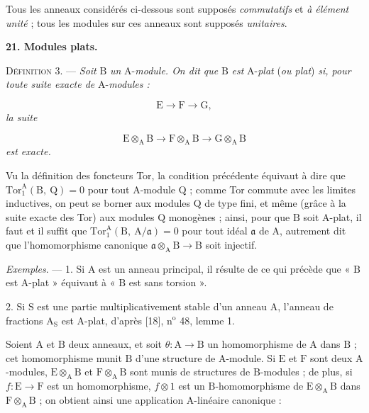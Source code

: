 Tous les anneaux considérés ci-dessous sont supposés \textit{commutatifs} et \textit{à élément unité} ; tous les modules sur ces anneaux sont supposés \textit{unitaires}.


\textbf{21. Modules plats.}

\textsc{Définition} 3. --- \textit{Soit} $\mathrm{B}$ \textit{un} $\mathrm{A}$-\textit{module. On dit que} $\mathrm{B}$ \textit{est} $\mathrm{A}$-\textit{plat} (\textit{ou plat}) \textit{si, pour toute suite exacte de} $\mathrm{A}$-\textit{modules :}

\begin{equation*}
\mathrm{E} \to \mathrm{F} \to \mathrm{G},
\end{equation*}
\textit{la suite}

\begin{equation*}
\mathrm{E} \otimes_{\mathrm{A}} \mathrm{B} \to \mathrm{F} \otimes_{\mathrm{A}} \mathrm{B} \to \mathrm{G} \otimes_{\mathrm{A}} \mathrm{B}
\end{equation*}
\textit{est exacte.}



Vu la définition des foncteurs Tor, la condition précédente équivaut à dire que $\mathrm{Tor}_1^{\mathrm{A}}(\mathrm{B},\ \mathrm{Q}) = 0$ pour tout $\mathrm{A}$-module $\mathrm{Q}$ ; comme Tor commute avec les limites inductives, on peut se borner aux modules $\mathrm{Q}$ de type fini, et même (grâce à la suite exacte des Tor) aux modules $\mathrm{Q}$ monogènes ; ainsi, pour que $\mathrm{B}$ soit $\mathrm{A}$-plat, il faut et il suffit que $\mathrm{Tor}_1^{\mathrm{A}}(\mathrm{B},\ \mathrm{A}/\mathfrak{a}) = 0$ pour tout idéal $\mathfrak{a}$ de $\mathrm{A}$, autrement dit que l'homomorphisme canonique $\mathfrak{a} \otimes_\mathrm{A} \mathrm{B} \to \mathrm{B}$ soit injectif.

\textit{Exemples}. --- 1. Si $\mathrm{A}$ est un anneau principal, il résulte de ce qui précède que « $\mathrm{B}$ est $\mathrm{A}$-plat » équivaut à « $\mathrm{B}$ est sans torsion ».

2. Si $\mathrm{S}$ est une partie multiplicativement stable d'un anneau $\mathrm{A}$, l'anneau de fractions $\mathrm{A}_{\mathrm{S}}$ est $\mathrm{A}$-plat, d'après [18], n$^{\mathrm{o}}$ 48, lemme 1.

Soient $\mathrm{A}$ et $\mathrm{B}$ deux anneaux, et soit $\theta : \mathrm{A} \to \mathrm{B}$ un homomorphisme de $\mathrm{A}$ dans $\mathrm{B}$ ; cet homomorphisme munit $\mathrm{B}$ d'une structure de $\mathrm{A}$-module. Si $\mathrm{E}$ et $\mathrm{F}$ sont deux $\mathrm{A}$-modules, $\mathrm{E} \otimes_\mathrm{A} \mathrm{B}$ et $\mathrm{F} \otimes_\mathrm{A} \mathrm{B}$ sont munis de structures de $\mathrm{B}$-modules ; de plus, si $f : \mathrm{E} \to \mathrm{F}$ est un homomorphisme, $f \otimes 1$ est un $\mathrm{B}$-homomorphisme de $\mathrm{E} \otimes_\mathrm{A} \mathrm{B}$ dans $\mathrm{F} \otimes_\mathrm{A} \mathrm{B}$ ; on obtient ainsi une application $\mathrm{A}$-linéaire canonique :

